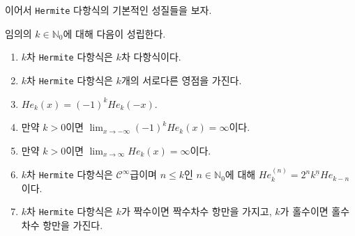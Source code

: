 이어서 \texttt{Hermite} 다항식의 기본적인 성질들을 보자.

\begin{theorem}\label{thm:hermitePolyProp}
    임의의 $k\in\mathbb{N}_0$에 대해 다음이 성립한다.
    \begin{enumerate}
        \item $k$차 \texttt{Hermite} 다항식은 $k$차 다항식이다.
        \item $k$차 \texttt{Hermite} 다항식은 $k$개의 서로다른 영점을 가진다.
        \item $He_k(x)=(-1)^kHe_k(-x)$.
        \item 만약 $k>0$이면 $\lim_{x\to-\infty}(-1)^kHe_k(x)=\infty$이다.
        \item 만약 $k>0$이면 $\lim_{x\to\infty}He_k(x)=\infty$이다.
        \item $k$차 \texttt{Hermite} 다항식은 $\mathcal{C}^\infty$급이며 $n\leq k$인 $n\in\mathbb{N}_0$에 대해 $He_k^{(n)}=2^nk^{\underline{n}}He_{k-n}$이다.
        \item $k$차 \texttt{Hermite} 다항식은 $k$가 짝수이면 짝수차수 항만을 가지고, $k$가 홀수이면 홀수차수 항만을 가진다.
    \end{enumerate}
\end{theorem}


